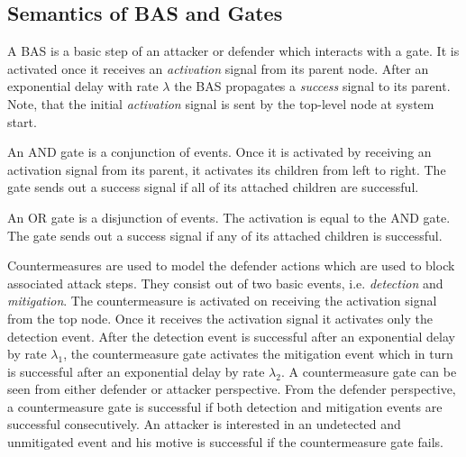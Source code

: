 \documentclass[submission,copyright,creativecommons]{eptcs}
\begin{document}
\subsection{Semantics of BAS and Gates}
\begin{description}[style=unboxed,leftmargin=0cm]
\item[Basic Attack Step (BAS):] A BAS is a basic step of an attacker or defender which interacts with a gate. It is activated once it receives an \textit{activation} signal from its parent node. After an exponential delay with rate $\lambda$ the BAS propagates a \textit{success} signal to its parent. Note, that the initial \textit{activation} signal is sent by the top-level node at system start. 

\item[AND:] An AND gate is a conjunction of events. Once it is activated by receiving an activation signal from its parent, it activates its children from left to right. The gate sends out a success signal if all of its attached children are successful. 

\item[OR:] An OR gate is a disjunction of events. The activation is equal to the AND gate. The gate sends out a success signal if any of its attached children is successful.

\item[Countermeasures:] Countermeasures are used to model the defender actions which are used to block associated attack steps. They consist out of two basic events, i.e. \emph{detection} and \emph{mitigation}. The countermeasure is activated on receiving the activation signal from the top node. Once it receives the activation signal it activates only the detection event. After the detection event is successful after an exponential delay by rate $\lambda_1$, the countermeasure gate activates the mitigation event which in turn is successful after an exponential delay by rate $\lambda_2$. A countermeasure gate can be seen from either defender or attacker perspective. From the defender perspective, a countermeasure gate is successful if both detection and mitigation events are successful consecutively. An attacker is interested in an undetected and unmitigated event and his motive is successful if the countermeasure gate fails.
\end{description}
\end{document}
